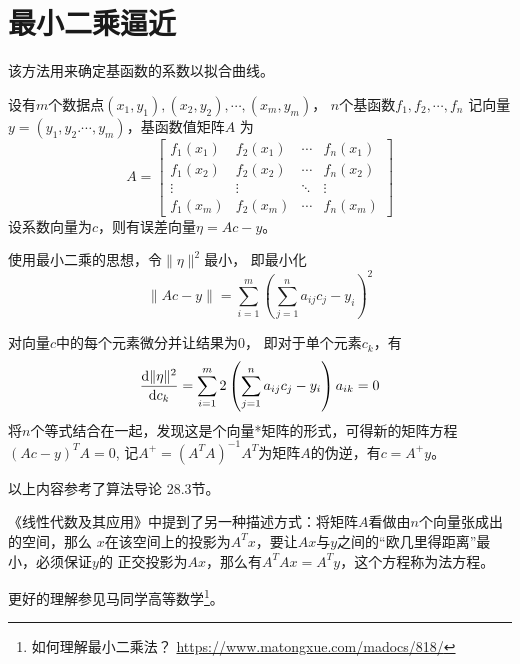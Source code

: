 \section{最小二乘逼近}
该方法用来确定基函数的系数以拟合曲线。

设有$m$个数据点$(x_1,y_1),(x_2,y_2),\cdots,(x_m,y_m)$，
$n$个基函数$f_1,f_2,\cdots,f_n$
记向量$y=(y_1,y_2.\cdots,y_m)$，基函数值矩阵$A$
为\begin{displaymath}
    A=\left[
    \begin{array}{cccc}
    f_1(x_1)&f_2(x_1)&\cdots&f_n(x_1)\\
    f_1(x_2)&f_2(x_2)&\cdots&f_n(x_2)\\
    \vdots&\vdots&\ddots&\vdots\\
    f_1(x_m)&f_2(x_m)&\cdots&f_n(x_m)
    \end{array}
    \right]
\end{displaymath}
设系数向量为$c$，则有误差向量$\eta=Ac-y$。

使用最小二乘的思想，令$\|\eta\|^2$最小，
即最小化
\begin{displaymath}
    \|Ac-y\|=\sum_{i=1}^m{\left(\sum_{j=1}^n{a_{ij}c_j}-y_i\right)}^2
\end{displaymath}

对向量$c$中的每个元素微分并让结果为0，
即对于单个元素$c_k$，有
\begin{displaymath}
    \frac{\textrm{d} \|\eta\|^2}{\textrm{d} c_k}=\sum_{i=1}^m{2\left(
        \sum_{j=1}^n{a_{ij}c_j-y_i}\right)a_{ik}}=0
\end{displaymath}
将$n$个等式结合在一起，发现这是个向量*矩阵的形式，可得新的矩阵方程$(Ac-y)^TA=0$,
记$A^+=(A^TA)^{-1}A^T$为矩阵$A$的伪逆，有$c=A^+y$。

以上内容参考了算法导论\cite{ITA3} 28.3节。

《线性代数及其应用》中提到了另一种描述方式：将矩阵$A$看做由$n$个向量张成出的空间，那么
$x$在该空间上的投影为$A^Tx$，要让$Ax$与$y$之间的``欧几里得距离''最小，必须保证$y$的
正交投影为$Ax$，那么有$A^TAx=A^Ty$，这个方程称为法方程。

更好的理解参见马同学高等数学\footnote{
    如何理解最小二乘法？
    \url{https://www.matongxue.com/madocs/818/}
}。
